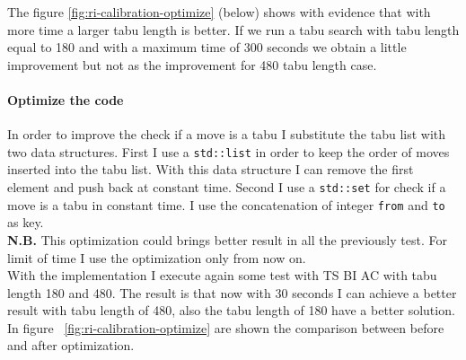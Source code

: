 			The figure \ref{fig:ri-calibration-optimize} (below) shows with evidence that with more time a larger tabu length is better. If we run a tabu search with tabu length equal to 180 and with a maximum time of 300 seconds we obtain a little improvement but not as the improvement for 480 tabu length case.
			
			
			\paragraph*{Optimize the code} In order to improve the check if a move is a tabu I substitute the tabu list with two data structures. First I use a \verb|std::list| in order to keep the order of moves inserted into the tabu list. With this data structure I can remove the first element and push back at constant time.
			Second I use a \verb|std::set| for check if a move is a tabu in constant time. I use the concatenation of integer \verb|from| and \verb|to| as key. \\
			
			\textbf{N.B.} This optimization could brings better result in all the previously test. For limit of time I use the optimization only from now on. \\
			
			With the implementation I execute again some test with TS BI AC with tabu length 180 and 480. The result is that now with 30 seconds I can achieve a better result with tabu length of 480, also the tabu length of 180 have a better solution. In figure ~\ref{fig:ri-calibration-optimize} are shown the comparison between before and after optimization. 
					
